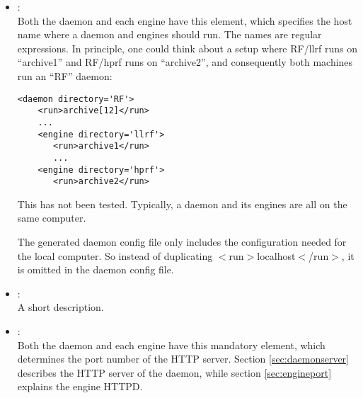 \begin{itemize}
\item {}:\\
      Both the daemon and each engine have this element, which
      specifies the host name where a daemon and engines should run.
      The names are regular expressions.
      In principle, one could think about a setup where
      RF/llrf runs on ``archive1'' and RF/hprf runs on
      ``archive2'', and consequently both machines run an
      ``RF'' daemon:
\begin{lstlisting}[keywordstyle=\sffamily]
 <daemon directory='RF'>
    <run>archive[12]</run>
    ...
    <engine directory='llrf'> 
       <run>archive1</run>
       ...
    <engine directory='hprf'> 
       <run>archive2</run>
\end{lstlisting}
      This has not been tested. Typically, a daemon and its engines
      are all on the same computer.

      The generated daemon config file only includes the configuration
      needed for the local computer.  So instead of duplicating
      $<$run$>$localhost$<$/run$>$, it is omitted in the daemon config file.
\item {}:\\
      A short description.
\item {}:\\
      Both the daemon and each engine have this mandatory element, which
      determines the port number of the HTTP server. Section
      \ref{sec:daemonserver} describes the HTTP server of the daemon, while
      section \ref{sec:engineport} explains the engine HTTPD.


\end{itemize}
